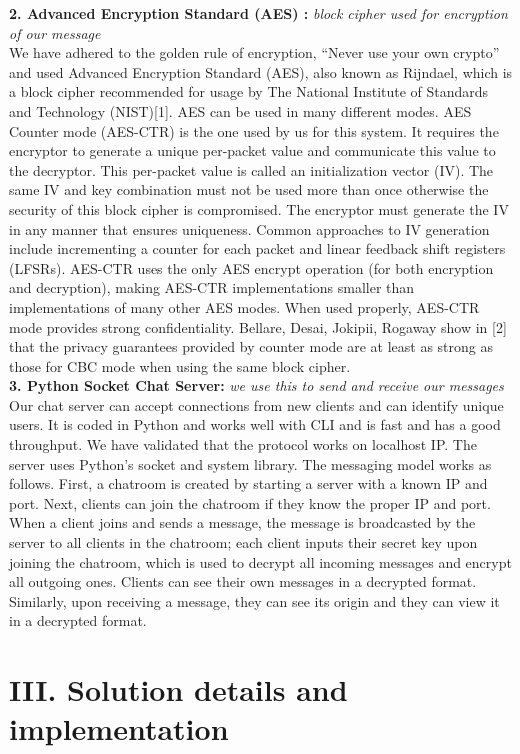 \documentclass[12pt]{article}
\begin{document}
\textbf{2. Advanced Encryption Standard (AES) :} \emph{block cipher used for encryption of our message}\\
We have adhered to the golden rule of encryption, “Never use your own crypto” and used Advanced Encryption Standard (AES), also known as Rijndael, which is a block cipher recommended for usage by The National Institute of Standards and Technology (NIST)[1]. AES can be used in many different modes. AES Counter mode (AES-CTR) is the one used by us for this system. It requires the encryptor to generate a unique per-packet value and communicate this value to the decryptor. This per-packet value is called an initialization vector (IV). The same IV and key combination must not be used more than once otherwise the security of this block cipher is compromised. The encryptor must generate the IV in any manner that ensures uniqueness. Common approaches to IV generation include incrementing a counter for each packet and linear feedback shift registers (LFSRs). AES-CTR uses the only AES encrypt operation (for both encryption and decryption), making AES-CTR implementations smaller than implementations of many other AES modes. When used properly, AES-CTR mode provides strong confidentiality. Bellare, Desai, Jokipii, Rogaway show in [2] that the privacy guarantees provided by counter mode are at least as strong as those for CBC mode when using the same block cipher.\\

\textbf{3. Python Socket Chat Server:}\emph{ we use this to send and receive our messages}\\
Our chat server can accept connections from new clients and can identify unique users. It is coded in Python and works well with CLI and is fast and has a good throughput. We have validated that the protocol works on localhost IP. The server uses Python’s socket and system library. The messaging model works as follows. First, a chatroom is created by starting a server with a known IP and port. Next, clients can join the chatroom if they know the proper IP and port. When a client joins and sends a message, the message is broadcasted by the server to all clients in the chatroom; each client inputs their secret key upon joining the chatroom, which is used to decrypt all incoming messages and encrypt all outgoing ones. Clients can see their own messages in a decrypted format. Similarly, upon receiving a message, they can see its origin and they can view it in a decrypted format.

\section*{III. Solution details and implementation}
\end{document}
